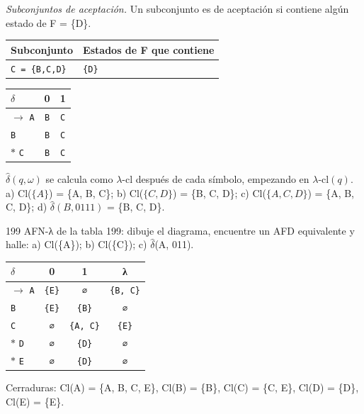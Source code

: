 \documentclass[11pt]{article}
\begin{document}
\textit{Subconjuntos de aceptación.} Un subconjunto es de aceptación si contiene algún estado de F = \{D\}.
\begin{center}\footnotesize\begin{tabular}{ll}\toprule
Subconjunto & Estados de F que contiene \\\midrule
\texttt{C = \{B,C,D\}} & \texttt{\{D\}} \\
\bottomrule\end{tabular}\end{center}
\begin{center}\small\begin{tabular}{lcc}\toprule
$\delta$ & 0 & 1 \\\midrule
$\to$ \texttt{A} & \texttt{B} & \texttt{C} \\
 \texttt{B} & \texttt{B} & \texttt{C} \\
$*$ \texttt{C} & \texttt{B} & \texttt{C} \\
\bottomrule\end{tabular}\end{center}
$\hat\delta(q, \omega)$ se calcula como $\lambda$-cl después de cada símbolo, empezando en $\lambda$-cl$(q)$.
\resp a) Cl($\{A\}$) = \{A, B, C\}; b) Cl($\{C, D\}$) = \{B, C, D\}; c) Cl($\{A, C, D\}$) = \{A, B, C, D\}; d) $\hat\delta(B, 0111)$ = \{B, C, D\}.


\begin{ejercicio}{199}{}
AFN-λ de la tabla 199: dibuje el diagrama, encuentre un AFD equivalente y halle: a) Cl(\{A\}); b) Cl(\{C\}); c) $\hat\delta$(A, 011).
\end{ejercicio}
\proc \begin{center}\small\begin{tabular}{lccc}\toprule
$\delta$ & 0 & 1 & λ \\\midrule
$\to$ \texttt{A} & \texttt{\{E\}} & \texttt{∅} & \texttt{\{B, C\}} \\
 \texttt{B} & \texttt{\{E\}} & \texttt{\{B\}} & \texttt{∅} \\
 \texttt{C} & \texttt{∅} & \texttt{\{A, C\}} & \texttt{\{E\}} \\
$*$ \texttt{D} & \texttt{∅} & \texttt{\{D\}} & \texttt{∅} \\
$*$ \texttt{E} & \texttt{∅} & \texttt{\{D\}} & \texttt{∅} \\
\bottomrule\end{tabular}\end{center}
Cerraduras: Cl(A) = \{A, B, C, E\}, Cl(B) = \{B\}, Cl(C) = \{C, E\}, Cl(D) = \{D\}, Cl(E) = \{E\}.
\end{document}
